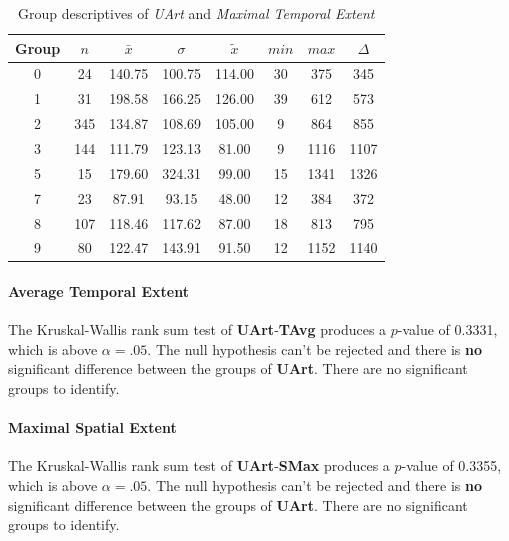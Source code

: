 \begin{table}[ht]
	\tiny
	\centering
    \begin{tabular}{c|c|c|c|c|c|c|c}
        \toprule
        Group & $n$ & $\bar{x}$ & $\sigma$ & $\tilde{x}$ & $min$ & $max$ & $\Delta$ \\
        \midrule
        0 & 24  & 140.75 & 100.75 & 114.00 & 30 & 375  & 345 \\ 
        1 & 31  & 198.58 & 166.25 & 126.00 & 39 & 612  & 573 \\ 
        2 & 345 & 134.87 & 108.69 & 105.00 & 9  & 864  & 855  \\ 
        3 & 144 & 111.79 & 123.13 & 81.00  & 9  & 1116 & 1107 \\ 
        5 & 15  & 179.60 & 324.31 & 99.00  & 15 & 1341 & 1326 \\ 
        7 & 23  & 87.91  & 93.15  & 48.00  & 12 & 384  & 372 \\ 
        8 & 107 & 118.46 & 117.62 & 87.00  & 18 & 813  & 795 \\ 
        9 & 80  & 122.47 & 143.91 & 91.50  & 12 & 1152 & 1140 \\ 
        \bottomrule
      \end{tabular}
    \caption{Group descriptives of \textit{UArt} and \textit{Maximal Temporal Extent}}
    \label{tbl:descriptives_baysis_initiator_UArt_TMax}
\end{table}

\paragraph{Average Temporal Extent}
The Kruskal-Wallis rank sum test of \textbf{UArt}-\textbf{TAvg} produces a $p$-value of 0.3331, which is above $\alpha=.05$. The null hypothesis can't be rejected and there is \textbf{no} significant difference between the groups of \textbf{UArt}. There are no significant groups to identify.

\paragraph{Maximal Spatial Extent}
The Kruskal-Wallis rank sum test of \textbf{UArt}-\textbf{SMax} produces a $p$-value of 0.3355, which is above $\alpha=.05$. The null hypothesis can't be rejected and there is \textbf{no} significant difference between the groups of \textbf{UArt}. There are no significant groups to identify.

